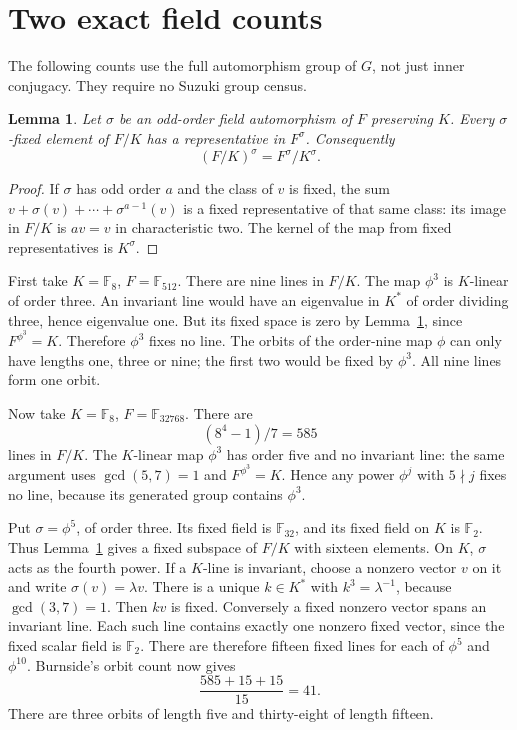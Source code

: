 \documentclass[11pt,a4paper]{article}
\newtheorem{lemma}[theorem]{Lemma}
\newcommand{\F}{\mathbb F}
\begin{document}
\section{Two exact field counts}
The following counts use the full automorphism group of $G$, not just
inner conjugacy. They require no Suzuki group census.

\begin{lemma}\label{fixed}
Let $\sigma$ be an odd-order field automorphism of $F$ preserving $K$.
Every $\sigma$-fixed element of $F/K$ has a representative in
$F^\sigma$. Consequently
\[
                       (F/K)^\sigma=F^\sigma/K^\sigma.
\]
\end{lemma}
\begin{proof}
If $\sigma$ has odd order $a$ and the class of $v$ is fixed, the sum
$v+\sigma(v)+\cdots+\sigma^{a-1}(v)$ is a fixed representative of
that same class: its image in $F/K$ is $av=v$ in characteristic two.
The kernel of the map from fixed representatives is $K^\sigma$.
\end{proof}

First take $K=\F_8$, $F=\F_{512}$. There are nine lines in $F/K$.
The map $\phi^3$ is $K$-linear of order three. An invariant line
would have an eigenvalue in $K^*$ of order dividing three, hence
eigenvalue one. But its fixed space is zero by Lemma~\ref{fixed},
since $F^{\phi^3}=K$. Therefore $\phi^3$ fixes no line. The orbits
of the order-nine map $\phi$ can only have lengths one, three or nine;
the first two would be fixed by $\phi^3$. All nine lines form one orbit.

Now take $K=\F_8$, $F=\F_{32768}$. There are
\[
                         (8^4-1)/7=585                  \tag{7}
\]
lines in $F/K$. The $K$-linear map $\phi^3$ has order five and no
invariant line: the same argument uses $\gcd(5,7)=1$ and
$F^{\phi^3}=K$. Hence any power $\phi^j$ with $5\nmid j$ fixes
no line, because its generated group contains $\phi^3$.

Put $\sigma=\phi^5$, of order three. Its fixed field is $\F_{32}$,
and its fixed field on $K$ is $\F_2$. Thus Lemma~\ref{fixed} gives
a fixed subspace of $F/K$ with sixteen elements. On $K$, $\sigma$
acts as the fourth power. If a $K$-line is invariant, choose a
nonzero vector $v$ on it and write $\sigma(v)=\lambda v$.
There is a unique $k\in K^*$ with $k^3=\lambda^{-1}$, because
$\gcd(3,7)=1$. Then $kv$ is fixed. Conversely a fixed nonzero vector
spans an invariant line. Each such line contains exactly one nonzero
fixed vector, since the fixed scalar field is $\F_2$. There are
therefore fifteen fixed lines for each of $\phi^5$ and $\phi^{10}$.
Burnside's orbit count now gives
\[
                            \frac{585+15+15}{15}=41.     \tag{8}
\]
There are three orbits of length five and thirty-eight of length
fifteen.
\end{document}
